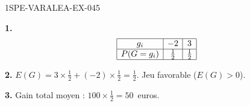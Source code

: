 \begin{corrige}{1SPE-VARALEA-EX-045}

\textbf{1.}
\[
\begin{array}{|c|c|c|}
\hline
g_i & -2 & 3 \\
\hline
P(G=g_i) & \frac{1}{2} & \frac{1}{2} \\
\hline
\end{array}
\]

\textbf{2.} $E(G) = 3 \times \frac{1}{2} + (-2) \times \frac{1}{2} = \frac{1}{2}$. Jeu favorable ($E(G) > 0$).

\textbf{3.} Gain total moyen : $100 \times \frac{1}{2} = 50$~euros.

\end{corrige}
